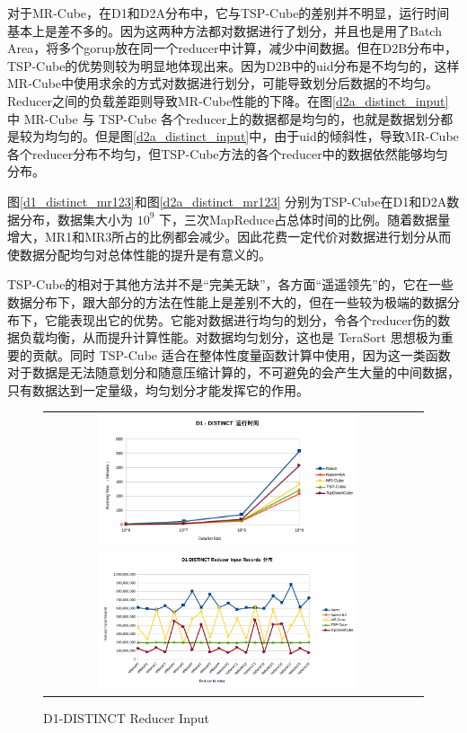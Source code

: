 对于MR-Cube，在D1和D2A分布中，它与TSP-Cube的差别并不明显，运行时间基本上是差不多的。因为这两种方法都对数据进行了划分，并且也是用了Batch Area，将多个gorup放在同一个reducer中计算，减少中间数据。但在D2B分布中，TSP-Cube的优势则较为明显地体现出来。因为D2B中的uid分布是不均匀的，这样MR-Cube中使用求余的方式对数据进行划分，可能导致划分后数据的不均匀。Reducer之间的负载差距则导致MR-Cube性能的下降。在图\ref{d2a_distinct_input}中 MR-Cube 与 TSP-Cube 各个reducer上的数据都是均匀的，也就是数据划分都是较为均匀的。但是图\ref{d2a_distinct_input}中，由于uid的倾斜性，导致MR-Cube各个reducer分布不均匀，但TSP-Cube方法的各个reducer中的数据依然能够均匀分布。

图\ref{d1_distinct_mr123}和图\ref{d2a_distinct_mr123} 分别为TSP-Cube在D1和D2A数据分布，数据集大小为 ${10}^{9}$ 下，三次MapReduce占总体时间的比例。随着数据量增大，MR1和MR3所占的比例都会减少。因此花费一定代价对数据进行划分从而使数据分配均匀对总体性能的提升是有意义的。

TSP-Cube的相对于其他方法并不是``完美无缺”，各方面``遥遥领先”的，它在一些数据分布下，跟大部分的方法在性能上是差别不大的，但在一些较为极端的数据分布下，它能表现出它的优势。它能对数据进行均匀的划分，令各个reducer伤的数据负载均衡，从而提升计算性能。对数据均匀划分，这也是 TeraSort 思想极为重要的贡献。同时 TSP-Cube 适合在整体性度量函数计算中使用，因为这一类函数对于数据是无法随意划分和随意压缩计算的，不可避免的会产生大量的中间数据，只有数据达到一定量级，均匀划分才能发挥它的作用。

\begin{figure}[!ht]
\begin{tabular}{cc}

\begin{minipage}[t]{0.5\textwidth}
\centering\includegraphics[width=3in]{picture/ch_experiment/d1_distinct_time} 
\caption{D1-DISTINCT 运行时间}\label{d1_distinct_time} 
\end{minipage}

\begin{minipage}[t]{0.5\textwidth}
\centering\includegraphics[width=3in]{picture/ch_experiment/d1_distinct_input} 
\caption{D1-DISTINCT Reducer Input}\label{d1_distinct_input} 
\end{minipage}

\end{tabular}
\end{figure}




